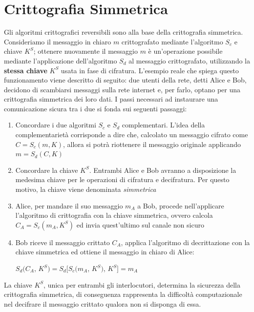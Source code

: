 \documentclass[a4paper,12pt]{tesiinfo}
\begin{document}
\section{Crittografia Simmetrica}
Gli algoritmi crittografici reversibili sono alla base della crittografia simmetrica. Consideriamo il messaggio in chiaro $m$ crittografato mediante l'algoritmo $S_c$ e chiave $K^S$; ottenere nuovamente il messaggio $m$ \`e un'operazione possibile mediante l'applicazione dell'algoritmo $S_d$ al messaggio crittografato, utilizzando la \textbf{stessa chiave} $K^S$ usata in fase di cifratura. L'esempio reale che spiega questo funzionamento viene descritto di seguito: due utenti della rete, detti Alice e Bob, decidono di scambiarsi messaggi sulla rete internet e, per farlo, optano per una crittografia simmetrica dei loro dati. I passi necessari ad instaurare una comunicazione sicura tra i due si fonda sui seguenti passaggi: 
\begin{enumerate}
 \item Concordare i due algoritmi $S_c$ e $S_d$ complementari. L'idea della complementariet\`a corrisponde a dire che, calcolato un messaggio cifrato come $C = S_c(m, K)$, allora si potr\`a riottenere il messaggio originale applicando $m = S_d(C, K)$
 \item Concordare la chiave $K^S$. Entrambi Alice e Bob avranno a disposizione la medesima chiave per le operazioni di cifratura e decifratura. Per questo motivo, la chiave viene denominata \textit{simmetrica}
 \item Alice, per mandare il suo messaggio $m_A$ a Bob, procede nell'applicare l'algoritmo di crittografia con la chiave simmetrica, ovvero calcola $C_A = S_c(m_A, K^S)$ ed invia quest'ultimo sul canale non sicuro
 \item Bob riceve il messaggio crittato $C_A$, applica l'algoritmo di decrittazione con la chiave simmetrica ed ottiene il messaggio in chiaro di Alice: 
 \begin{center}
  $S_d(C_A$, $K^S) = S_d[S_c(m_A$, $K^S)$, $K^S] = m_A$
 \end{center}
\end{enumerate}
La chiave $K^S$, unica per entrambi gli interlocutori, determina la sicurezza della crittografia simmetrica, di conseguenza rappresenta la difficolt\`a computazionale nel decifrare il messaggio crittato qualora non si disponga di essa. 
\\
\end{document}
